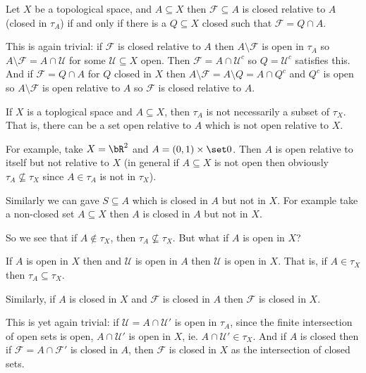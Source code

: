 \documentclass[10pt]{article}
\def\mU{\mathcal{U}}
\def\mF{\mathcal{F}}
\begin{document}
\begin{prop*}

    Let $X$ be a topological space, and $A\subseteq X$ then $\mF\subseteq A$ is closed relative to $A$ (closed in $\tau_A$) if and only if there is a $Q\subseteq X$ closed such that $\mF=Q\cap A$.

\end{prop*}

This is again trivial: if $\mF$ is closed relative to $A$ then $A\setminus\mF$ is open in $\tau_A$ so $A\setminus\mF = A\cap\mU$ for some $\mU\subseteq X$ open.
Then $\mF=A\cap\mU^c$ so $Q=\mU^c$ satisfies this.
And if $\mF=Q\cap A$ for $Q$ closed in $X$ then $A\setminus\mF=A\setminus Q=A\cap Q^c$ and $Q^c$ is open so $A\setminus\mF$ is open relative to $A$ so $\mF$ is closed relative to $A$.

\begin{exam*}

    If $X$ is a toplogical space and $A\subseteq X$, then $\tau_A$ is not necessarily a subset of $\tau_X$.
    That is, there can be a set open relative to $A$ which is not open relative to $X$.

    For example, take $X=\bR^2$ and $A=(0,1)\times\set0$.
    Then $A$ is open relative to itself but not relative to $X$ (in general if $A\subseteq X$ is not open then obviously $\tau_A\not\subseteq\tau_X$ since $A\in\tau_A$ is not in $\tau_X$).

    Similarly we can gave $S\subseteq A$ which is closed in $A$ but not in $X$.
    For example take a non-closed set $A\subseteq X$ then $A$ is closed in $A$ but not in $X$.

\end{exam*}

So we see that if $A\notin\tau_X$, then $\tau_A\not\subseteq\tau_X$.
But what if $A$ is open in $X$?

\begin{prop*}

    If $A$ is open in $X$ then and $\mU$ is open in $A$ then $\mU$ is open in $X$.
    That is, if $A\in\tau_X$ then $\tau_A\subseteq\tau_X$.

    Similarly, if $A$ is closed in $X$ and $\mF$ is closed in $A$ then $\mF$ is closed in $X$.

\end{prop*}

This is yet again trivial: if $\mU=A\cap\mU'$ is open in $\tau_A$, since the finite intersection of open sets is open, $A\cap\mU'$ is open in $X$, ie. $A\cap\mU'\in\tau_X$.
And if $A$ is closed then if $\mF=A\cap\mF'$ is closed in $A$, then $\mF$ is closed in $X$ as the intersection of closed sets.
\end{document}
